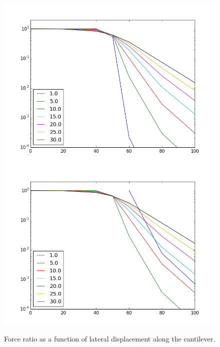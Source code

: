 \documentclass[11pt]{article}
\begin{document}
\begin{figure}[h]
\centering
\includegraphics[width=5in]{lateral_force_drop}
\includegraphics[width=5in]{lateral_force_drop_finite}
\caption{Force ratio as a function of lateral displacement along the cantilever.}\label{fig:latdrop}
\end{figure}
\end{document}

